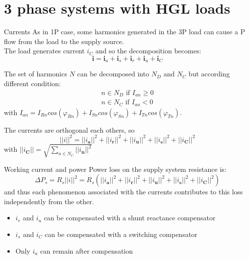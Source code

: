\documentclass[aspectratio=169]{beamer}
\begin{document}
\section{3 phase systems with HGL loads}
  \begin{frame}{Currents}{\insertsection}
    As in 1P case, some harmonics generated in the 3P load can cause a P flow from the load to the supply source. \\
    The load generates current $i_C$ and so the decomposition becomes:
    \begin{equation}
      \pmb{i}=\pmb{i}_a + \pmb{i}_s + \pmb{i}_r + \pmb{i}_u  + \pmb{i}_C
    \end{equation}

    The set of harmonics $N$ can be decomposed into $N_D$ and $N_C$ but according different condition:
    \begin{gather}
      n \in N_D \text{ if } I_{an} \ge 0\\
      n \in N_C \text{ if } I_{an}< 0
    \end{gather}
    with $I_{an}=I_{Rn}cos(\varphi_{Rn}) + I_{Sn}cos(\varphi_{Sn}) + I_{Tn}cos(\varphi_{Tn})$.
    
    The currents are orthogonal each others, so
    \begin{equation}
      ||\pmb{\mathit{i}}||^2 = ||\pmb{\mathit{i}_a}||^2 + ||\pmb{\mathit{i}_r}||^2 + ||\pmb{\mathit{i}_u}||^2 + ||\pmb{\mathit{i}_s}||^2 + ||\pmb{\mathit{i}_C}||^2
    \end{equation}
    with $||\pmb{\mathit{i}_C}||=\sqrt{\sum_{n\in N_C}||\pmb{\mathit{i}_n}||^2}$
  \end{frame}

  \begin{frame}{Working current and power}{\insertsection}
    Power loss on the supply system resistance is: 
    \begin{equation}
    \Delta P_s = R_s||\pmb{\mathit{i}}||^2 = R_s\left(||\pmb{\mathit{i}_a}||^2 + ||\pmb{\mathit{i}_r}||^2 + ||\pmb{\mathit{i}_u}||^2 + ||\pmb{\mathit{i}_s}||^2 + ||\pmb{\mathit{i}_C}||^2\right)
    \end{equation}
    and thus each phenomenon associated with the currents contributes to this loss independently from the other.
    \begin{itemize}
      \item $\pmb{\mathit{i_r}}$ and $\pmb{\mathit{i_u}}$ can be compensated with a shunt reactance compensator
      \item $\pmb{\mathit{i_s}}$ and $\pmb{\mathit{i_C}}$ can be compensated with a switching compensator
      \item Only $\pmb{\mathit{i_a}}$ can remain after compensation
    \end{itemize}
  \end{frame}
  
\end{document}
